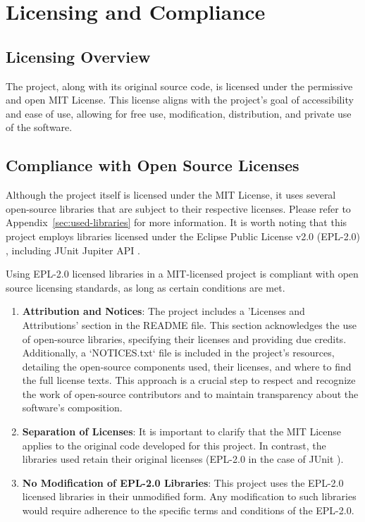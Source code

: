\section{Licensing and Compliance}

\subsection{Licensing Overview}
The project, along with its original source code, is licensed under the permissive and open MIT License. This license aligns with the project's goal of accessibility and ease of use, allowing for free use, modification, distribution, and private use of the software.

\subsection{Compliance with Open Source Licenses}
Although the project itself is licensed under the MIT License, it uses several open-source libraries that are subject to their respective licenses. Please refer to Appendix~\ref{sec:used-libraries} for more information. It is worth noting that this project employs libraries licensed under the Eclipse Public License v2.0 (EPL-2.0) , including JUnit Jupiter API .

Using EPL-2.0 licensed libraries in a MIT-licensed project is compliant with open source licensing standards, as long as certain conditions are met.
\begin{enumerate}
    \item \textbf{Attribution and Notices}: The project includes a 'Licenses and Attributions' section in the README file. This section acknowledges the use of open-source libraries, specifying their licenses and providing due credits. Additionally, a `NOTICES.txt` file is included in the project's resources, detailing the open-source components used, their licenses, and where to find the full license texts. This approach is a crucial step to respect and recognize the work of open-source contributors and to maintain transparency about the software's composition.
    \item \textbf{Separation of Licenses}: It is important to clarify that the MIT License applies to the original code developed for this project. In contrast, the libraries used retain their original licenses (EPL-2.0 in the case of JUnit ).
    \item \textbf{No Modification of EPL-2.0 Libraries}: This project uses the EPL-2.0 licensed libraries in their unmodified form. Any modification to such libraries would require adherence to the specific terms and conditions of the EPL-2.0.
\end{enumerate}

